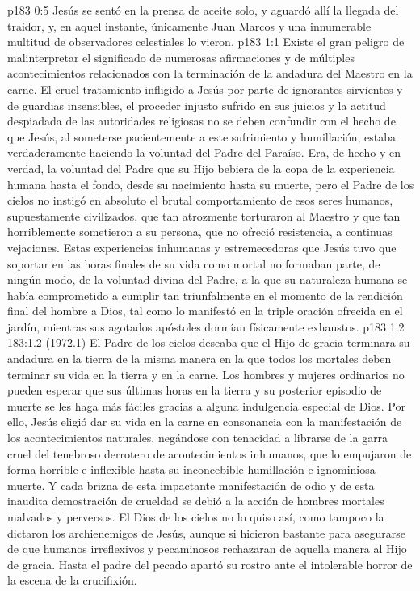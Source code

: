 \vs p183 0:5 Jesús se sentó en la prensa de aceite solo, y aguardó allí la llegada del traidor, y, en aquel instante, únicamente Juan Marcos y una innumerable multitud de observadores celestiales lo vieron.
\vs p183 1:1 Existe el gran peligro de malinterpretar el significado de numerosas afirmaciones y de múltiples acontecimientos relacionados con la terminación de la andadura del Maestro en la carne. El cruel tratamiento infligido a Jesús por parte de ignorantes sirvientes y de guardias insensibles, el proceder injusto sufrido en sus juicios y la actitud despiadada de las autoridades religiosas no se deben confundir con el hecho de que Jesús, al someterse pacientemente a este sufrimiento y humillación, estaba verdaderamente haciendo la voluntad del Padre del Paraíso. Era, de hecho y en verdad, la voluntad del Padre que su Hijo bebiera de la copa de la experiencia humana hasta el fondo, desde su nacimiento hasta su muerte, pero el Padre de los cielos no instigó en absoluto el brutal comportamiento de esos seres humanos, supuestamente civilizados, que tan atrozmente torturaron al Maestro y que tan horriblemente sometieron a su persona, que no ofreció resistencia, a continuas vejaciones. Estas experiencias inhumanas y estremecedoras que Jesús tuvo que soportar en las horas finales de su vida como mortal no formaban parte, de ningún modo, de la voluntad divina del Padre, a la que su naturaleza humana se había comprometido a cumplir tan triunfalmente en el momento de la rendición final del hombre a Dios, tal como lo manifestó en la triple oración ofrecida en el jardín, mientras sus agotados apóstoles dormían físicamente exhaustos.
\vs p183 1:2 183:1.2 (1972.1) El Padre de los cielos deseaba que el Hijo de gracia terminara su andadura en la tierra  de la misma manera en la que todos los mortales deben terminar su vida en la tierra y en la carne. Los hombres y mujeres ordinarios no pueden esperar que sus últimas horas en la tierra y su posterior episodio de muerte se les haga más fáciles gracias a alguna indulgencia especial de Dios. Por ello, Jesús eligió dar su vida en la carne en consonancia con la manifestación de los acontecimientos naturales, negándose con tenacidad a librarse de la garra cruel del tenebroso derrotero de acontecimientos inhumanos, que lo empujaron de forma horrible e inflexible hasta su inconcebible humillación e ignominiosa muerte. Y cada brizna de esta impactante manifestación de odio y de esta inaudita demostración de crueldad se debió a la acción de hombres mortales malvados y perversos. El Dios de los cielos no lo quiso así, como tampoco la dictaron los archienemigos de Jesús, aunque si hicieron bastante para asegurarse de que humanos irreflexivos y pecaminosos rechazaran de aquella manera al Hijo de gracia. Hasta el padre del pecado apartó su rostro ante el intolerable horror de la escena de la crucifixión.
